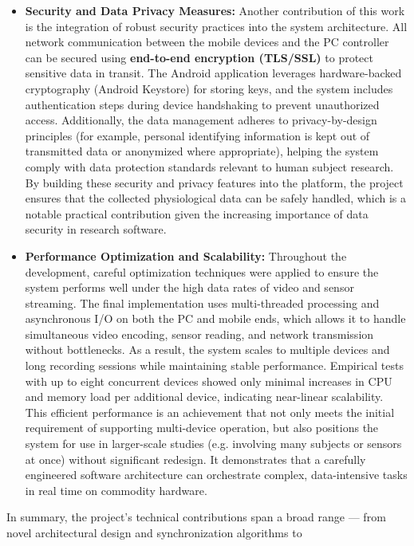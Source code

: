 \documentclass[11pt,a4paper]{report}
\begin{document}
\begin{itemize}
\item \textbf{Security and Data Privacy Measures:} Another contribution of this
  work is the integration of robust security practices into the system
  architecture. All network communication between the mobile devices and
  the PC controller can be secured using \textbf{end-to-end encryption
  (TLS/SSL)} to protect sensitive data in transit. The Android
  application leverages hardware-backed cryptography (Android Keystore)
  for storing keys, and the system includes authentication steps during
  device handshaking to prevent unauthorized access. Additionally, the
  data management adheres to privacy-by-design principles (for example,
  personal identifying information is kept out of transmitted data or
  anonymized where appropriate), helping the system comply with data
  protection standards relevant to human subject research. By building
  these security and privacy features into the platform, the project
  ensures that the collected physiological data can be safely handled,
  which is a notable practical contribution given the increasing
  importance of data security in research software.

\item \textbf{Performance Optimization and Scalability:} Throughout the
  development, careful optimization techniques were applied to ensure
  the system performs well under the high data rates of video and sensor
  streaming. The final implementation uses multi-threaded processing and
  asynchronous I/O on both the PC and mobile ends, which allows it to
  handle simultaneous video encoding, sensor reading, and network
  transmission without bottlenecks. As a result, the system scales to
  multiple devices and long recording sessions while maintaining stable
  performance. Empirical tests with up to eight concurrent devices
  showed only minimal increases in CPU and memory load per additional
  device, indicating near-linear scalability. This efficient performance
  is an achievement that not only meets the initial requirement of
  supporting multi-device operation, but also positions the system for
  use in larger-scale studies (e.g. involving many subjects or sensors
  at once) without significant redesign. It demonstrates that a
  carefully engineered software architecture can orchestrate complex,
  data-intensive tasks in real time on commodity hardware.

\end{itemize}
In summary, the project's technical contributions span a broad range ---
from novel architectural design and synchronization algorithms to
\end{document}
